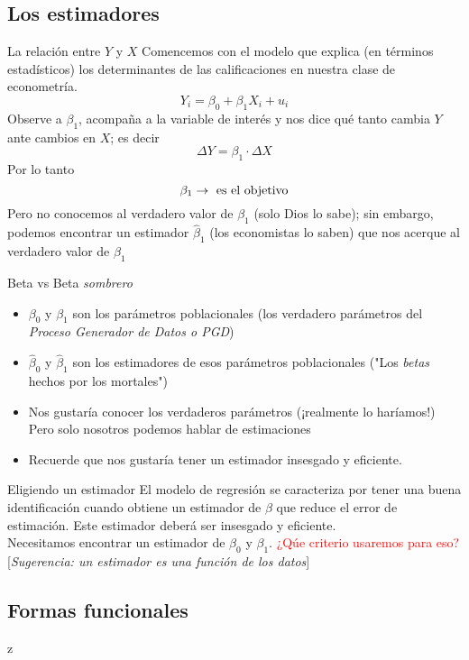 \subsection{Los estimadores}
\begin{frame}{La relación entre $Y$ y $X$}
	Comencemos con el modelo que explica (en términos estadísticos) los determinantes de las calificaciones en nuestra clase de econometría.
			$$Y_i = \beta_0 + \beta_1X_i + u_i$$
	Observe a $\beta_{1}$, acompaña a la variable de interés y nos dice qué tanto cambia $Y$ ante cambios en $X$; es decir  $$\Delta Y = \beta_{1} \cdot \Delta X$$Por lo tanto $$\beta_{1} \rightarrow \textup{ es el objetivo}$$Pero no conocemos al verdadero valor de  $\beta_{1}$ (solo Dios lo sabe); sin embargo, podemos encontrar un estimador $\hat{\beta}_{1}$ (los economistas lo saben) que nos acerque al verdadero valor de $\beta_{1}$\
\end{frame}
\begin{frame}{Beta vs Beta \textit{sombrero}}
	\begin{itemize}
		\item $\beta_{0}$ y $\beta_{1}$ son los parámetros poblacionales (los verdadero parámetros del \textit{Proceso Generador de Datos o PGD})
		\item $\widehat{\beta}_{0}$ y $\widehat{\beta}_{1}$ son los estimadores de esos parámetros poblacionales ("Los \textit{betas} hechos por los mortales")
		\item Nos gustaría conocer los verdaderos parámetros (¡realmente lo haríamos!) Pero solo nosotros podemos hablar de estimaciones
		\item Recuerde que nos gustaría tener un estimador insesgado y eficiente.
	\end{itemize}
\end{frame}
\begin{frame}{Eligiendo un estimador}
	El modelo de regresión se caracteriza por tener una buena identificación cuando obtiene un estimador de $\beta$ que reduce el error de estimación. Este estimador deberá ser insesgado y eficiente.\\
	\bigskip
	Necesitamos encontrar un estimador de $\beta_0$ y $\beta_1$. \textcolor{red}{¿Qúe criterio usaremos para eso?} [\textit{Sugerencia: un estimador es una función de los datos}]
\end{frame}

\subsection{Formas funcionales}
z